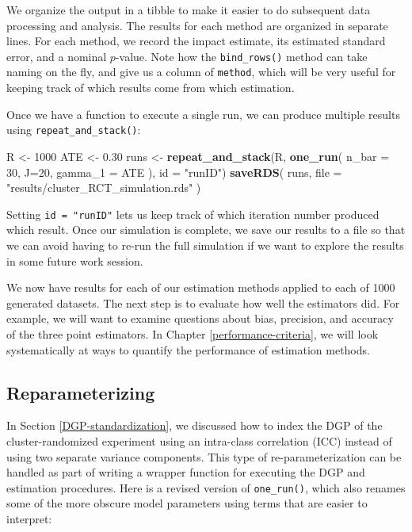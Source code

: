 \documentclass[
]{book}
\newenvironment{Shaded}{\begin{snugshade}}{\end{snugshade}}
\newcommand{\AttributeTok}[1]{\textcolor[rgb]{0.13,0.29,0.53}{#1}}
\newcommand{\DecValTok}[1]{\textcolor[rgb]{0.00,0.00,0.81}{#1}}
\newcommand{\FloatTok}[1]{\textcolor[rgb]{0.00,0.00,0.81}{#1}}
\newcommand{\FunctionTok}[1]{\textcolor[rgb]{0.13,0.29,0.53}{\textbf{#1}}}
\newcommand{\NormalTok}[1]{#1}
\newcommand{\OtherTok}[1]{\textcolor[rgb]{0.56,0.35,0.01}{#1}}
\newcommand{\StringTok}[1]{\textcolor[rgb]{0.31,0.60,0.02}{#1}}
\begin{document}
We organize the output in a tibble to make it easier to do subsequent data processing and analysis.
The results for each method are organized in separate lines.
For each method, we record the impact estimate, its estimated standard error, and a nominal \(p\)-value.
Note how the \texttt{bind\_rows()} method can take naming on the fly, and give us a column of \texttt{method}, which will be very useful for keeping track of which results come from which estimation.

Once we have a function to execute a single run, we can produce multiple results using \texttt{repeat\_and\_stack()}:

\begin{Shaded}
\begin{Highlighting}[]
\NormalTok{R }\OtherTok{\textless{}{-}} \DecValTok{1000}
\NormalTok{ATE }\OtherTok{\textless{}{-}} \FloatTok{0.30}
\NormalTok{runs }\OtherTok{\textless{}{-}} \FunctionTok{repeat\_and\_stack}\NormalTok{(R, }
                         \FunctionTok{one\_run}\NormalTok{( }\AttributeTok{n\_bar =} \DecValTok{30}\NormalTok{, }\AttributeTok{J=}\DecValTok{20}\NormalTok{, }\AttributeTok{gamma\_1 =}\NormalTok{ ATE ),}
                         \AttributeTok{id =} \StringTok{"runID"}\NormalTok{) }
\FunctionTok{saveRDS}\NormalTok{( runs, }\AttributeTok{file =} \StringTok{"results/cluster\_RCT\_simulation.rds"}\NormalTok{ )}
\end{Highlighting}
\end{Shaded}

Setting \texttt{id\ =\ "runID"} lets us keep track of which iteration number produced which result.
Once our simulation is complete, we save our results to a file so that we can avoid having to re-run the full simulation if we want to explore the results in some future work session.

We now have results for each of our estimation methods applied to each of 1000 generated datasets.
The next step is to evaluate how well the estimators did.
For example, we will want to examine questions about bias, precision, and accuracy of the three point estimators.
In Chapter \ref{performance-criteria}, we will look systematically at ways to quantify the performance of estimation methods.

\subsection{Reparameterizing}\label{one-run-reparameterization}

In Section \ref{DGP-standardization}, we discussed how to index the DGP of the cluster-randomized experiment using an intra-class correlation (ICC) instead of using two separate variance components.
This type of re-parameterization can be handled as part of writing a wrapper function for executing the DGP and estimation procedures.
Here is a revised version of \texttt{one\_run()}, which also renames some of the more obscure model parameters using terms that are easier to interpret:
\end{document}
